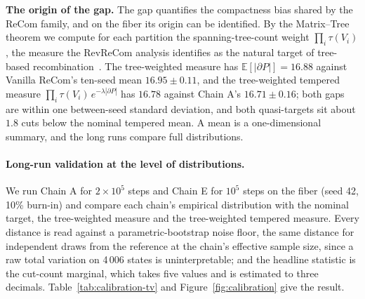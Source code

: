 \documentclass[11pt]{article}
\newcommand{\E}{\mathbb{E}}
\begin{document}
\textbf{The origin of the gap.} The gap quantifies the compactness
bias shared by the ReCom family, and on the fiber its origin can be
identified. By the Matrix--Tree theorem we compute for each partition
the spanning-tree-count weight $\prod_i \tau(V_i)$, the measure the
RevReCom analysis identifies as the natural target of tree-based
recombination~\cite{cannon2022spanning,autry2023metropolized}. The
tree-weighted measure has $\E[|\partial P|] = 16.88$ against Vanilla
ReCom's ten-seed mean $16.95 \pm 0.11$, and the tree-weighted tempered
measure $\prod_i \tau(V_i)\, e^{-\lambda|\partial P|}$ has $16.78$
against Chain A's $16.71 \pm 0.16$; both gaps are within one
between-seed standard deviation, and both quasi-targets sit about
$1.8$ cuts below the nominal tempered mean. A mean is a
one-dimensional summary, and the long runs compare full
distributions.

\paragraph{Long-run validation at the level of distributions.}\label{sec:exp-longrun}
We run Chain A for $2 \times 10^5$ steps and Chain E for $10^5$ steps
on the fiber (seed 42, 10\% burn-in) and compare each chain's
empirical distribution with the nominal target, the tree-weighted
measure and the tree-weighted tempered measure. Every distance is
read against a parametric-bootstrap noise floor, the same distance for
independent draws from the reference at the chain's effective sample
size, since a raw total variation on 4\,006 states is uninterpretable;
and the headline statistic is the cut-count marginal, which takes five
values and is estimated to three decimals.
Table~\ref{tab:calibration-tv} and Figure~\ref{fig:calibration} give
the result.
\end{document}
